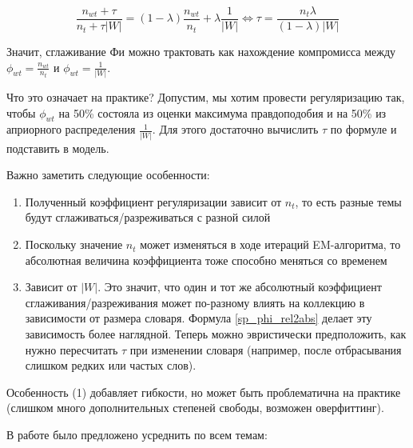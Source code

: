  

 

\[ 

\frac{n_{wt} + \tau}{n_{t} + \tau |W|} = (1-\lambda) \frac{n_{wt}}{n_t} + \lambda \frac{1}{|W|} \iff \tau  = \frac{n_t \lambda}{(1-\lambda) |W|} \label{sp_phi_rel2abs}  

\] 

 

Значит, сглаживание Фи можно трактовать как нахождение компромисса между $\phi_{wt} = \frac{n_{wt}}{n_t}$ и $\phi_{wt} = \frac{1}{|W|}$.  

 

Что это означает на практике? Допустим, мы хотим провести регуляризацию так, чтобы $\phi_{wt}$ на 50\% состояла из оценки максимума правдоподобия и на 50\% из априорного распределения $\frac{1}{|W|}$. Для этого достаточно вычислить $\tau$ по формуле и подставить в модель. 

 

Важно заметить следующие особенности:  

 

\begin{enumerate} 

    \item  {Полученный коэффициент регуляризации зависит от $n_t$, то есть разные темы будут сглаживаться/разреживаться с разной силой} 

    \item  {Поскольку значение $n_t$ может изменяться в ходе итераций EM-алгоритма, то абсолютная величина коэффициента тоже способно меняться со временем} 

    \item  {Зависит от $|W|$. Это значит, что один и тот же абсолютный коэффициент сглаживания/разреживания может по-разному влиять на коллекцию в зависимости от размера словаря.  Формула \ref{sp_phi_rel2abs} делает эту зависимость более наглядной. Теперь можно эвристически предположить, как нужно пересчитать $\tau$ при изменении словаря (например, после отбрасывания слишком редких или частых слов).} 

\end{enumerate} 

 

Особенность (1) добавляет гибкости, но может быть проблематична на практике (слишком много дополнительных степеней свободы, возможен оверфиттинг). 

 

В работе \cite{doykov} было предложено усреднить по всем темам: 

